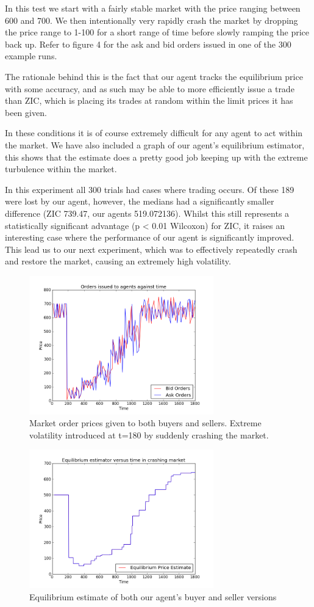 \documentclass{acm_proc_article-sp}
\begin{document}
In this test we start with a fairly stable market with the price ranging
between 600 and 700. We then intentionally very rapidly crash the market by
dropping the price range to 1-100 for a short range of time before slowly
ramping the price back up.  Refer to figure 4 for the ask and bid orders
issued in one of the 300 example runs.

The rationale behind this is the fact that our agent tracks the equilibrium price
with some accuracy, and as such may be able to more efficiently issue a trade
than ZIC, which is placing its trades at random within the limit prices it has
been given.

In these conditions it is of course extremely difficult for any agent to act
within the market. We have also included a graph of our agent's equilibrium
estimator, this shows that the estimate does a pretty good job keeping up with
the extreme turbulence within the market.

In this experiment all 300 trials had cases where trading occurs. Of these 189
were lost by our agent, however, the medians had a significantly smaller
difference (ZIC 739.47, our agents 519.072136). Whilst this still represents a
statistically significant advantage (p < 0.01 Wilcoxon) for ZIC, it raises an
interesting case where the performance of our agent is significantly improved.
This lead us to our next experiment, which was to effectively repeatedly crash
and restore the market, causing an extremely high volatility.

\begin{figure}[h!] \includegraphics[width=80mm]{crash.png} \caption{Market
order prices given to both buyers and sellers. Extreme volatility introduced at
t=180 by suddenly crashing the market.} \end{figure}

\begin{figure}[h!]
\includegraphics[width=80mm]{crash2.png} \caption{Equilibrium estimate of both
our agent's buyer and seller versions} \end{figure}
\end{document}
